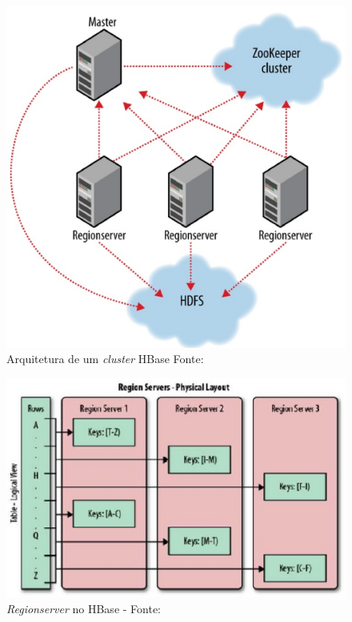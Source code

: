             \begin{figure}[ht!]
                        \centering
                        \includegraphics[keepaspectratio=true,scale=0.5]
                            {figuras/figura11.eps}
                        \caption[Arquitetura de um \textit{cluster} HBase]{Arquitetura de um \textit{cluster} HBase
                        \protect Fonte: }
                        \label{figura11}
            \end{figure}

            \begin{figure}[ht!]
                        \centering
                        \includegraphics[keepaspectratio=true,scale=0.7]
                            {figuras/figura12.eps}
                        \caption[\textit{Regionserver} no HBase]{\textit{Regionserver} no HBase -
                        \protect Fonte: }
                        \label{figura12}
            \end{figure}


